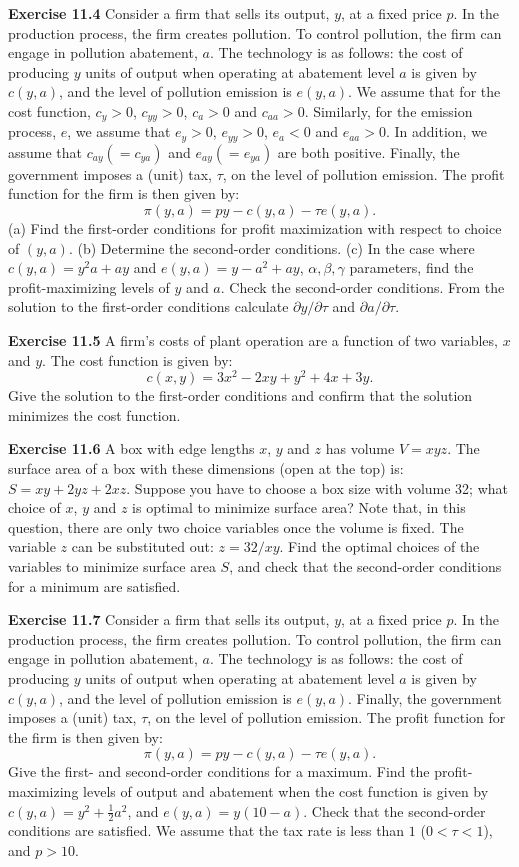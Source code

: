 \begin{original}
\textbf{Exercise 11.4} Consider a firm that sells its output, $y$, at a fixed price $p$. In the production process, the firm creates pollution. To control pollution, the firm can engage in pollution abatement, $a$. The technology is as follows: the cost of producing $y$ units of output when operating at abatement level $a$ is given by $c(y, a)$, and the level of pollution emission is $e(y, a)$. We assume that for the cost function, $c_y > 0$, $c_{yy} > 0$, $c_a > 0$ and $c_{aa} > 0$. Similarly, for the emission process, $e$, we assume that $e_y > 0$, $e_{yy} > 0$, $e_a < 0$ and $e_{aa} > 0$. In addition, we assume that $c_{ay}(= c_{ya})$ and $e_{ay}(= e_{ya})$ are both positive. Finally, the government imposes a (unit) tax, $\tau$, on the level of pollution emission. The profit function for the firm is then given by:
\[
\pi(y, a) = py - c(y, a) - \tau e(y, a).
\]
(a) Find the first-order conditions for profit maximization with respect to choice of $(y, a)$.
(b) Determine the second-order conditions.
(c) In the case where $c(y, a) = y^2 a + ay$ and $e(y, a) = y - a^2 + ay$, $\alpha, \beta, \gamma$ parameters, find the profit-maximizing levels of $y$ and $a$. Check the second-order conditions. From the solution to the first-order conditions calculate $\partial y/\partial \tau$ and $\partial a/\partial \tau$.

\textbf{Exercise 11.5} A firm's costs of plant operation are a function of two variables, $x$ and $y$. The cost function is given by:
\[
c(x, y) = 3x^2 - 2xy + y^2 + 4x + 3y.
\]
Give the solution to the first-order conditions and confirm that the solution minimizes the cost function.

\textbf{Exercise 11.6} A box with edge lengths $x$, $y$ and $z$ has volume $V = xyz$. The surface area of a box with these dimensions (open at the top) is: $S = xy + 2yz + 2xz$. Suppose you have to choose a box size with volume 32; what choice of $x$, $y$ and $z$ is optimal to minimize surface area? Note that, in this question, there are only two choice variables once the volume is fixed. The variable $z$ can be substituted out: $z = 32/xy$. Find the optimal choices of the variables to minimize surface area $S$, and check that the second-order conditions for a minimum are satisfied.

\textbf{Exercise 11.7} Consider a firm that sells its output, $y$, at a fixed price $p$. In the production process, the firm creates pollution. To control pollution, the firm can engage in pollution abatement, $a$. The technology is as follows: the cost of producing $y$ units of output when operating at abatement level $a$ is given by $c(y, a)$, and the level of pollution emission is $e(y, a)$. Finally, the government imposes a (unit) tax, $\tau$, on the level of pollution emission. The profit function for the firm is then given by:
\[
\pi(y, a) = py - c(y, a) - \tau e(y, a).
\]
Give the first- and second-order conditions for a maximum. Find the profit-maximizing levels of output and abatement when the cost function is given by $c(y, a) = y^2 + \frac{1}{2}a^2$, and $e(y, a) = y(10 - a)$. Check that the second-order conditions are satisfied. We assume that the tax rate is less than $1$ ($0 < \tau < 1$), and $p > 10$.


\end{original}
